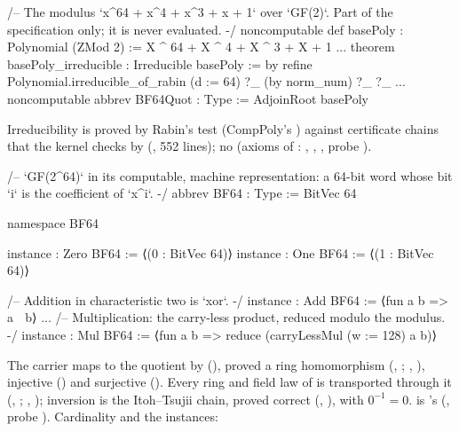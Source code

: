 \begin{leancode}
/-- The modulus `x^64 + x^4 + x^3 + x + 1` over `GF(2)`. Part of the specification only;
it is never evaluated. -/
noncomputable def basePoly : Polynomial (ZMod 2) := X ^ 64 + X ^ 4 + X ^ 3 + X + 1
...
theorem basePoly_irreducible : Irreducible basePoly := by
  refine Polynomial.irreducible_of_rabin (d := 64) ?_ (by norm_num) ?_ ?_
...
noncomputable abbrev BF64Quot : Type := AdjoinRoot basePoly
\end{leancode}


Irreducibility is proved by Rabin's test (CompPoly's \allowbreak{}\allowbreak{})
against certificate chains that the kernel checks by  (\allowbreak{},
552 lines); no  (axioms of : ,
, , probe ).

\begin{leancode}
/-- `GF(2^64)` in its computable, machine representation: a 64-bit word whose bit `i` is
the coefficient of `x^i`. -/
abbrev BF64 : Type := BitVec 64

namespace BF64

instance : Zero BF64 := ⟨(0 : BitVec 64)⟩
instance : One BF64 := ⟨(1 : BitVec 64)⟩

/-- Addition in characteristic two is `xor`. -/
instance : Add BF64 := ⟨fun a b => a ^^^ b⟩
...
/-- Multiplication: the carry-less product, reduced modulo the modulus. -/
instance : Mul BF64 :=
  ⟨fun a b => reduce (carryLessMul (w := 128) a b)⟩
\end{leancode}


The carrier maps to the quotient by \allowbreak{}
(), proved a ring homomorphism (, ; ,
), injective () and surjective (). Every ring and field law of
 is transported through it (, ; ,
); inversion is the Itoh--Tsujii chain, proved correct (,
), with $0^{-1} = 0$.  is 's
(, probe ). Cardinality and the instances:

